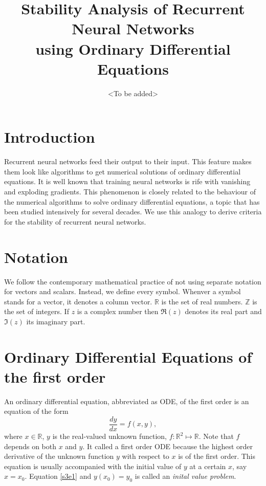 \documentclass{article}
\numberwithin{equation}{section}
\begin{document}
\title{Stability Analysis of Recurrent Neural Networks \\
    using Ordinary Differential Equations}
\author{<To be added>}
\maketitle
\section{Introduction}\label{s1}
Recurrent neural networks feed their output to their input. This feature
makes them look like algorithms to get numerical solutions of ordinary
differential equations. It is well known that training neural networks is
rife with vanishing and exploding gradients\cite{gereon2018hands}. This
phenomenon is closely related to the behaviour of the numerical algorithms
to solve ordinary differential equations, a topic that has been studied
intensively for several decades. We use this analogy to derive criteria for
the stability of recurrent neural networks.

\section{Notation}\label{s2}
We follow the contemporary mathematical practice of not using separate
notation for vectors and scalars. Instead, we define every symbol. Whenver
a symbol stands for a vector, it denotes a column vector. $\mathbb{R}$ is 
the set of real numbers. $\mathbb{Z}$ is the set of integers. If $z$ is
a complex number then $\Re(z)$ denotes its real part and $\Im(z)$ its
imaginary part.

\section{Ordinary Differential Equations of the first order}\label{s3}
An ordinary differential equation, abbreviated as ODE, of the first order 
is an equation of the form
\begin{equation}\label{s3e1}
\frac{dy}{dx} = f(x, y),
\end{equation}
where $x \in \mathbb{R}$, $y$ is the real-valued unknown function, $f: 
\mathbb{R}^2 \mapsto \mathbb{R}$. Note that $f$ depends on both $x$ and 
$y$. It called a first order ODE because the highest order derivative
of the unknown function $y$ with respect to $x$ is of the first order.
This equation is usually accompanied with the initial value of $y$ at a 
certain $x$, say $x = x_0$. Equation \eqref{s3e1} and $y(x_0) = y_0$ is
called an \emph{inital value problem}.
\end{document}
